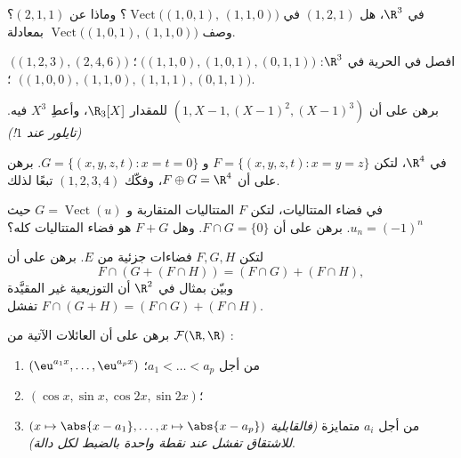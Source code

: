 \begin{exercise}[$\star$]\label{exo:b1:vspaces:2}
في $\R^3$، هل $(1, 2, 1)$ في
$\operatorname{Vect}\bigl((1,0,1),\, (1,1,0)\bigr)$؟ وماذا عن $(2, 1,
1)$؟ وصف $\operatorname{Vect}\bigl((1,0,1),(1,1,0)\bigr)$ بمعادلة.
\end{exercise}

\begin{exercise}[$\star$]\label{exo:b1:vspaces:3}
افصل في الحرية في $\R^3$: $\;\bigl((1,1,0), (1,0,1),
(0,1,1)\bigr)$؛ $\;\bigl((1,2,3), (2,4,6)\bigr)$؛
$\;\bigl((1,0,0), (1,1,0), (1,1,1), (0,1,1)\bigr)$.
\end{exercise}

\begin{exercise}[$\star$]\label{exo:b1:vspaces:4}
برهن على أن $(1, X - 1, (X-1)^2, (X-1)^3)$  للمقدار $\R_3[X]$،
وأعطِ  $X^3$ فيه. \emph{(تايلور عند $1$!)}
\end{exercise}

\begin{exercise}[$\star\star$]\label{exo:b1:vspaces:5}
في $\R^4$، لتكن $F = \{(x,y,z,t) : x = y = z\}$ و $G = \{(x,y,z,t)
: x = t = 0\}$. برهن على أن $F \oplus G = \R^4$، وفكّك
$(1,2,3,4)$ تبعًا لذلك.
\end{exercise}

\begin{exercise}[$\star\star$]\label{exo:b1:vspaces:6}
في فضاء المتتاليات، لتكن $F$  المتتاليات
المتقاربة و $G = \operatorname{Vect}(u)$ حيث $u_n = (-1)^n$.
برهن على أن $F \cap G = \{0\}$. وهل $F + G$ هو فضاء المتتاليات
كله؟
\end{exercise}

\begin{exercise}[$\star\star$]\label{exo:b1:vspaces:7}
لتكن $F, G, H$ فضاءات جزئية من $E$. برهن على أن
\[
F \cap (G + (F \cap H)) = (F \cap G) + (F \cap H),
\]
وبيّن بمثال في $\R^2$ أن التوزيعية غير المقيَّدة
$F \cap (G + H) = (F\cap G) + (F \cap H)$ تفشل.
\end{exercise}

\begin{exercise}[$\star\star\star$]\label{exo:b1:vspaces:8}
برهن على أن العائلات الآتية من $\mathcal{F}(\R, \R)$ :
\begin{enumerate}
  \item $(\eu^{a_1 x}, \dots, \eu^{a_p x})$ من أجل $a_1 < \dots < a_p$؛
  \item $(\cos x, \sin x, \cos 2x, \sin 2x)$؛
  \item $(x \mapsto \abs{x - a_1}, \dots, x \mapsto \abs{x - a_p})$
        من أجل $a_i$ متمايزة \emph{(فالقابلية للاشتقاق تفشل عند نقطة
        واحدة بالضبط لكل دالة)}.
\end{enumerate}
\end{exercise}

